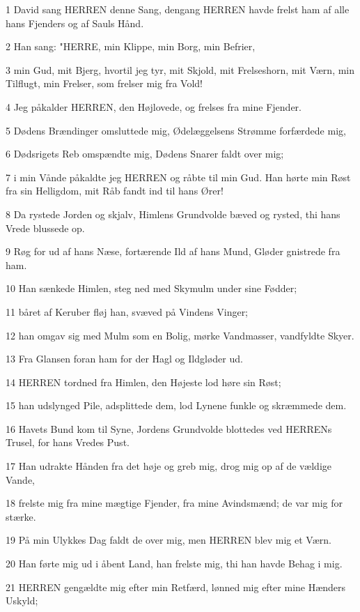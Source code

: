 \par 1 David sang HERREN denne Sang, dengang HERREN havde frelst ham af alle hans Fjenders og af Sauls Hånd.
\par 2 Han sang: "HERRE, min Klippe, min Borg, min Befrier,
\par 3 min Gud, mit Bjerg, hvortil jeg tyr, mit Skjold, mit Frelseshorn, mit Værn, min Tilflugt, min Frelser, som frelser mig fra Vold!
\par 4 Jeg påkalder HERREN, den Højlovede, og frelses fra mine Fjender.
\par 5 Dødens Brændinger omsluttede mig, Ødelæggelsens Strømme forfærdede mig,
\par 6 Dødsrigets Reb omspændte mig, Dødens Snarer faldt over mig;
\par 7 i min Vånde påkaldte jeg HERREN og råbte til min Gud. Han hørte min Røst fra sin Helligdom, mit Råb fandt ind til hans Ører!
\par 8 Da rystede Jorden og skjalv, Himlens Grundvolde bæved og rysted, thi hans Vrede blussede op.
\par 9 Røg for ud af hans Næse, fortærende Ild af hans Mund, Gløder gnistrede fra ham.
\par 10 Han sænkede Himlen, steg ned med Skymulm under sine Fødder;
\par 11 båret af Keruber fløj han, svæved på Vindens Vinger;
\par 12 han omgav sig med Mulm som en Bolig, mørke Vandmasser, vandfyldte Skyer.
\par 13 Fra Glansen foran ham for der Hagl og Ildgløder ud.
\par 14 HERREN tordned fra Himlen, den Højeste lod høre sin Røst;
\par 15 han udslynged Pile, adsplittede dem, lod Lynene funkle og skræmmede dem.
\par 16 Havets Bund kom til Syne, Jordens Grundvolde blottedes ved HERRENs Trusel, for hans Vredes Pust.
\par 17 Han udrakte Hånden fra det høje og greb mig, drog mig op af de vældige Vande,
\par 18 frelste mig fra mine mægtige Fjender, fra mine Avindsmænd; de var mig for stærke.
\par 19 På min Ulykkes Dag faldt de over mig, men HERREN blev mig et Værn.
\par 20 Han førte mig ud i åbent Land, han frelste mig, thi han havde Behag i mig.
\par 21 HERREN gengældte mig efter min Retfærd, lønned mig efter mine Hænders Uskyld;
